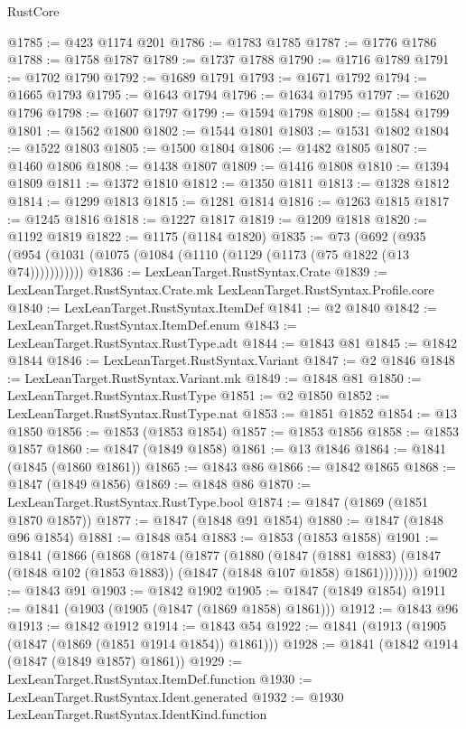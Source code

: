 \begin{lexlean}{RustCore}
\begin{coremodule}
@1785 := @423 @1174 @201
@1786 := @1783 @1785
@1787 := @1776 @1786
@1788 := @1758 @1787
@1789 := @1737 @1788
@1790 := @1716 @1789
@1791 := @1702 @1790
@1792 := @1689 @1791
@1793 := @1671 @1792
@1794 := @1665 @1793
@1795 := @1643 @1794
@1796 := @1634 @1795
@1797 := @1620 @1796
@1798 := @1607 @1797
@1799 := @1594 @1798
@1800 := @1584 @1799
@1801 := @1562 @1800
@1802 := @1544 @1801
@1803 := @1531 @1802
@1804 := @1522 @1803
@1805 := @1500 @1804
@1806 := @1482 @1805
@1807 := @1460 @1806
@1808 := @1438 @1807
@1809 := @1416 @1808
@1810 := @1394 @1809
@1811 := @1372 @1810
@1812 := @1350 @1811
@1813 := @1328 @1812
@1814 := @1299 @1813
@1815 := @1281 @1814
@1816 := @1263 @1815
@1817 := @1245 @1816
@1818 := @1227 @1817
@1819 := @1209 @1818
@1820 := @1192 @1819
@1822 := @1175 (@1184 @1820)
@1835 := @73
    (@692 (@935 (@954 (@1031 (@1075 (@1084 (@1110 (@1129 (@1173 (@75 @1822 (@13 @74)))))))))))
@1836 := LexLeanTarget.RustSyntax.Crate
@1839 := LexLeanTarget.RustSyntax.Crate.mk LexLeanTarget.RustSyntax.Profile.core
@1840 := LexLeanTarget.RustSyntax.ItemDef
@1841 := @2 @1840
@1842 := LexLeanTarget.RustSyntax.ItemDef.enum
@1843 := LexLeanTarget.RustSyntax.RustType.adt
@1844 := @1843 @81
@1845 := @1842 @1844
@1846 := LexLeanTarget.RustSyntax.Variant
@1847 := @2 @1846
@1848 := LexLeanTarget.RustSyntax.Variant.mk
@1849 := @1848 @81
@1850 := LexLeanTarget.RustSyntax.RustType
@1851 := @2 @1850
@1852 := LexLeanTarget.RustSyntax.RustType.nat
@1853 := @1851 @1852
@1854 := @13 @1850
@1856 := @1853 (@1853 @1854)
@1857 := @1853 @1856
@1858 := @1853 @1857
@1860 := @1847 (@1849 @1858)
@1861 := @13 @1846
@1864 := @1841 (@1845 (@1860 @1861))
@1865 := @1843 @86
@1866 := @1842 @1865
@1868 := @1847 (@1849 @1856)
@1869 := @1848 @86
@1870 := LexLeanTarget.RustSyntax.RustType.bool
@1874 := @1847 (@1869 (@1851 @1870 @1857))
@1877 := @1847 (@1848 @91 @1854)
@1880 := @1847 (@1848 @96 @1854)
@1881 := @1848 @54
@1883 := @1853 (@1853 @1858)
@1901 := @1841
    (@1866
      (@1868
        (@1874
          (@1877
            (@1880
              (@1847
                (@1881 @1883)
                (@1847 (@1848 @102 (@1853 @1883)) (@1847 (@1848 @107 @1858) @1861))))))))
@1902 := @1843 @91
@1903 := @1842 @1902
@1905 := @1847 (@1849 @1854)
@1911 := @1841 (@1903 (@1905 (@1847 (@1869 @1858) @1861)))
@1912 := @1843 @96
@1913 := @1842 @1912
@1914 := @1843 @54
@1922 := @1841 (@1913 (@1905 (@1847 (@1869 (@1851 @1914 @1854)) @1861)))
@1928 := @1841 (@1842 @1914 (@1847 (@1849 @1857) @1861))
@1929 := LexLeanTarget.RustSyntax.ItemDef.function
@1930 := LexLeanTarget.RustSyntax.Ident.generated
@1932 := @1930 LexLeanTarget.RustSyntax.IdentKind.function

\end{coremodule}
\end{lexlean}
